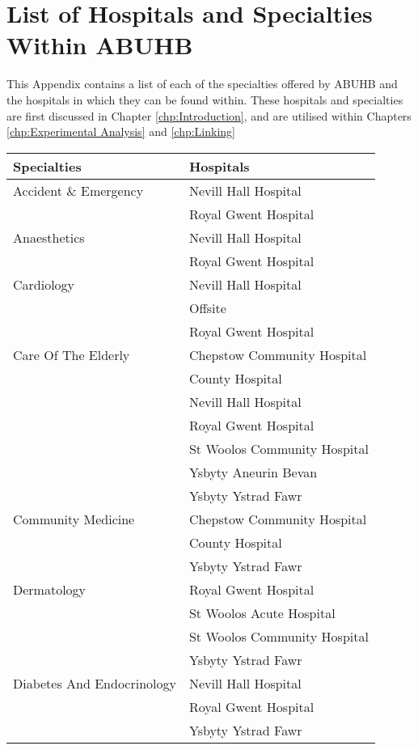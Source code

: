 \documentclass[thesis.tex]{subfiles}
\begin{document}
\chapter{List of Hospitals and Specialties Within ABUHB}\label{App:Hospitals}
This Appendix contains a list of each of the specialties offered by ABUHB and the hospitals in which they can be found within. These hospitals and specialties are first discussed in Chapter \ref{chp:Introduction}, and are utilised within Chapters \ref{chp:Experimental Analysis} and \ref{chp:Linking}
\small

\begin{flushleft}

    \begin{longtable}{ll}\hline
    \textbf{Specialties}   & \textbf{Hospitals}  \\\hline\endfirsthead
        Accident \& Emergency &	Nevill Hall Hospital\\
	&Royal Gwent Hospital\\\hline
Anaesthetics	&Nevill Hall Hospital\\
	&Royal Gwent Hospital\\\hline
Cardiology&	Nevill Hall Hospital\\
	&Offsite\\
	&Royal Gwent Hospital\\\hline 
Care Of The Elderly&	Chepstow Community Hospital\\
	&County Hospital\\
	&Nevill Hall Hospital\\
	&Royal Gwent Hospital\\
	&St Woolos Community Hospital\\
	&Ysbyty Aneurin Bevan\\
	&Ysbyty Ystrad Fawr\\\hline
Community Medicine	&Chepstow Community Hospital\\
	&County Hospital\\
	&Ysbyty Ystrad Fawr\\\hline
Dermatology	&Royal Gwent Hospital\\
	&St Woolos Acute Hospital\\
	&St Woolos Community Hospital\\
	&Ysbyty Ystrad Fawr\\\hline
Diabetes And Endocrinology&	Nevill Hall Hospital\\
	&Royal Gwent Hospital\\
	&Ysbyty Ystrad Fawr\\\hline

\end{longtable}
\end{flushleft}
\end{document}
